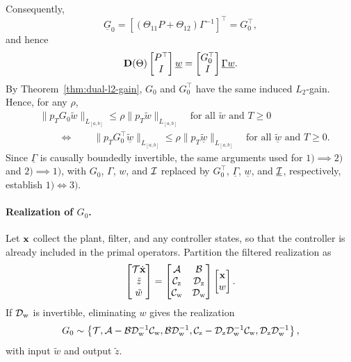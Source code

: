 Consequently,
\[
    \underline G_0
    =\left[(\Theta_{11}P+\Theta_{12})\Gamma^{-1}\right]^\top
    =G_0^\top,
\]
and hence
\[
    \mathbf{D}(\Theta)\begin{bmatrix}P^\top\\I\end{bmatrix}\underline w
    =\begin{bmatrix}G_0^\top\\I\end{bmatrix}\underline\Gamma\underline w.
\]
By Theorem~\ref{thm:dual-l2-gain}, $G_0$ and $G_0^\top$ have the
same induced $L_2$-gain. Hence, for any $\rho$,
\[
\begin{aligned}
&\|p_TG_0\tilde w\|_{L_{[a,b]}}
 \leq\rho\|p_T\tilde w\|_{L_{[a,b]}}
 \quad\text{for all $\tilde w$ and $T\geq0$}\\
&\qquad\Longleftrightarrow\qquad
\|p_TG_0^\top\underline{\tilde w}\|_{L_{[a,b]}}
 \leq\rho\|p_T\underline{\tilde w}\|_{L_{[a,b]}}
 \quad\text{for all $\underline{\tilde w}$ and $T\geq0$}.
\end{aligned}
\] Since
$\underline\Gamma$ is causally boundedly invertible, the same arguments used
for $1)\implies2)$ and $2)\implies1)$, with
$G_0$, $\Gamma$, $w$, and $\mathcal{I}$ replaced by
$G_0^\top$, $\underline\Gamma$, $\underline w$, and
$\underline{\mathcal{I}}$, respectively, establish $1)\iff3)$.

\paragraph{Realization of $G_0$.}
Let $\mathbf{x}$ collect the plant, filter, and any controller states, so that the
controller is already included in the primal operators. Partition the filtered realization as
\[
\begin{bmatrix}\mathcal{T}\dot{\mathbf{x}}\\\tilde z\\\tilde w\end{bmatrix}
=
\begin{bmatrix}\mathcal{A}&\mathcal{B}\\\mathcal{C}_{{\mathrm{z}}}&\mathcal{D}_{{\mathrm{z}}}\\
\mathcal{C}_{{\mathrm{w}}}&\mathcal{D}_{{\mathrm{w}}}\end{bmatrix}
\begin{bmatrix}\mathbf{x}\\w\end{bmatrix}.
\]
If $\mathcal{D}_{{\mathrm{w}}}$ is invertible, eliminating $w$ gives the realization
\begin{equation}\label{eq:G0-primal-realization}
G_0\sim
\left\{
\mathcal{T},
\mathcal{A}-\mathcal{B}\mathcal{D}_{{\mathrm{w}}}^{-1}\mathcal{C}_{{\mathrm{w}}},
\mathcal{B}\mathcal{D}_{{\mathrm{w}}}^{-1},
\mathcal{C}_{{\mathrm{z}}}-\mathcal{D}_{{\mathrm{z}}}\mathcal{D}_{{\mathrm{w}}}^{-1}\mathcal{C}_{{\mathrm{w}}},
\mathcal{D}_{{\mathrm{z}}}\mathcal{D}_{{\mathrm{w}}}^{-1}
\right\},
\end{equation}
with input $\tilde w$ and output $\tilde z$.
